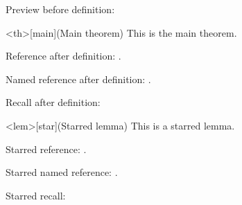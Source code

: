 \documentclass{article}
\begin{document}
Preview before definition:


\begin{statementsp}<th>[main](Main theorem)
This is the main theorem.
\end{statementsp}

Reference after definition: .

Named reference after definition: .

Recall after definition:


\begin{statementsp*}<lem>[star](Starred lemma)
This is a starred lemma.
\end{statementsp*}

Starred reference: .

Starred named reference: .

Starred recall:

\end{document}
